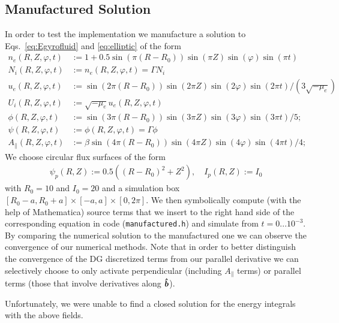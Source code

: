 

\subsection{Manufactured Solution}
In order to test the implementation we manufacture a solution to Eqs.~\eqref{eq:Egyrofluid} and \eqref{eq:elliptic} of the form
\begin{align*}
n_e(R,Z,\varphi, t) &:= 1 + 0.5\sin(\pi(R-R_0))\sin(\pi Z)\sin(\varphi)\sin(\pi t) \\
N_i(R,Z,\varphi, t) &:= n_e(R,Z,\varphi,t) = \Gamma N_i  \\
u_e(R,Z,\varphi, t) &:= \sin(2\pi(R-R_0))\sin(2\pi Z)\sin(2\varphi)\sin(2\pi t)/(3\sqrt{-\mu_e}) \\
U_i(R,Z,\varphi, t) &:= \sqrt{-\mu_e}u_e(R,Z,\varphi,t) \\
\phi(R,Z,\varphi,t) &:= \sin(3\pi(R-R_0))\sin(3\pi Z)\sin(3\varphi)\sin(3\pi t)/5; \\
\psi(R,Z,\varphi,t) &:= \phi(R,Z,\varphi, t) = \Gamma \phi \\
A_\parallel( R,Z,\varphi,t) &:= \beta\sin(4\pi(R-R_0))\sin(4\pi Z)\sin(4\varphi)\sin(4\pi t)/4;
\end{align*}
We choose circular flux surfaces of the form
\begin{align*}
\psi_p(R,Z) :=0.5((R-R_0)^2 + Z^2),\quad
I_p(R,Z):=I_0
\end{align*}
with $R_0=10$ and $I_0=20$ and a simulation box $[R_0-a,R_0+a]\times[-a,a]\times[0,2\pi]$.
We then symbolically compute (with the help of Mathematica) source terms that we insert to the right hand side of
the corresponding equation in code (\texttt{manufactured.h}) and simulate from $t=0...10^{-3}$.
By comparing the numerical solution to the manufactured one we can observe the convergence of our numerical methods. Note that in order to better distinguish
the convergence of the DG discretized terms from our parallel derivative
we can selectively choose to only activate perpendicular (including $A_\parallel$ terms) or parallel terms (those that involve derivatives along $\bm{\hat{b}}$).

Unfortunately, we were unable to find a closed solution for the energy integrals with the above fields.

